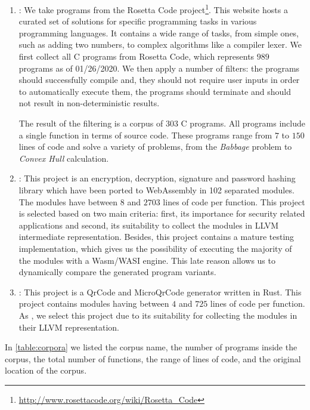 \begin{enumerate}
    \item \textbf{\corpusrosetta}: We take programs from the  Rosetta Code project\footnote{\url{http://www.rosettacode.org/wiki/Rosetta_Code}}. This website hosts a curated set of solutions for specific programming tasks in various  programming languages. It contains a wide range of tasks, from simple ones, such as adding two numbers, to complex algorithms like a compiler lexer.  We first collect all C programs from Rosetta Code, which represents $989$ programs as of 01/26/2020.  We then apply a number of filters: the programs should successfully compile and, they should not require user inputs in order to automatically execute them, the programs should terminate and should not result in non-deterministic results. 
    
    The result of the filtering is a corpus of 303 C programs. All programs include a single function in terms of source code. These programs range from $7$ to $150$ lines of code and solve a variety of problems, from the \textit{Babbage} problem to  \textit{Convex Hull} calculation.

    \item \textbf{\corpussodium}: This project is an encryption, decryption, signature and password hashing library which have been ported to WebAssembly in 102 separated modules. The modules have between $8$ and $2703$ lines of code per function. This project is selected based on two main criteria: first, its importance for security related applications and second, its suitability to collect the modules in LLVM intermediate representation. Besides, this project contains a mature testing implementation, which gives us the possibility of executing the majority of the modules with a Wasm/WASI engine. This late reason allows us to dynamically compare the generated program variants.

    \item \textbf{\corpusqrcode}: This project is a QrCode and MicroQrCode generator written in Rust. This project contains  modules having between $4$ and $725$ lines of code per function. As \corpussodium, we select this project due to its suitability for collecting the modules in their LLVM representation.
\end{enumerate}

In \autoref{table:corpora} we listed the corpus name, the number of programs inside the corpus, the total number of functions, the range of lines of code, and the original location of the corpus. 


